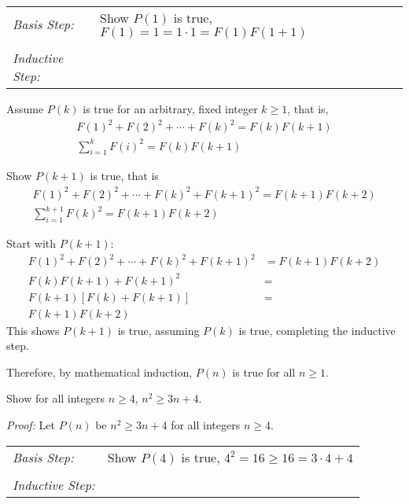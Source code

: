 \documentclass[10pt,addpoints]{exam}
\begin{document}
\begin{questions}
\begin{solution}
	\smallskip
	\begin{tabular}{lp{4in}}
	  \textit{Basis Step:} & Show $P(1)$ is true, $F(1) = 1 = 1\cdot1 = F(1)F(1+1)$ \\
	   & \\
	 \textit{Inductive Step:} &  \\
	\end{tabular}

	Assume $P(k)$ is true for an arbitrary, fixed integer $k \geq 1$, that is,
	\begin{align*}
		F(1)^2 + F(2)^2 + \cdots + F(k)^2  = F(k)F(k+1)  \tag{IH} \\
		\sum_{i=1}^k F(i)^2 = F(k)F(k+1)
	\end{align*}

	Show $P(k+1)$ is true, that is
	\begin{align*}
	 	F(1)^2 + F(2)^2 + \cdots + F(k)^2 + F(k+1)^2 = F(k+1)F(k+2) \\
	 	\sum_{i=1}^{k+1} F(k)^2 = F(k+1)F(k+2) 
	\end{align*}

	Start with $P(k+1)$:
	\begin{align*}
		F(1)^2 + F(2)^2 + \cdots + F(k)^2 + F(k+1)^2 &= F(k+1)F(k+2) \\
		F(k)F(k+1) + F(k+1)^2 &= \tag{IH} \\
		F(k+1)\left[ F(k) + F(k+1) \right] &= \\
		F(k+1)F(k+2) 
	\end{align*}
	This shows $P(k+1)$ is true, assuming $P(k)$ is true, completing the inductive step. 

	Therefore, by mathematical induction, $P(n)$ is true for all $n \geq 1$.
\end{solution}



\question[10] Show for all integers $n \geq 4$, $n^2 \geq 3n + 4$. 
    \ifprintanswers
        \vspace{-10pt}
   \fi
\begin{solution}
	\textit{Proof:}
	Let $P(n)$ be $n^2 \geq 3n + 4$ for all integers $n \geq 4$.

	\smallskip
	\begin{tabular}{lp{4in}}
	  \textit{Basis Step:} & Show $P(4)$ is true, $4^2 = 16 \geq 16 = 3\cdot 4 + 4$ \\
	   & \\
	 \textit{Inductive Step:} &  \\
	\end{tabular}


\end{solution}
\end{questions}
\end{document}
